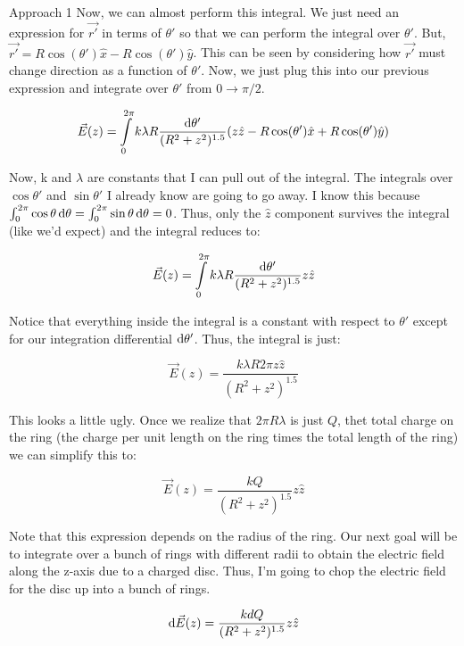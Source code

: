 \begin{homeworkProblem}
\begin{homeworkSection}{Approach 1}
        Now, we can almost perform this integral. We just need an
        expression for $\vec{r'}$ in terms of $\theta'$ so that we can
        perform the integral over $\theta'$. But, $\vec{r'} =
        R\cos(\theta')\hat{x} - R\cos(\theta')\hat{y}$. This can be seen
        by considering how $\vec{r'}$ must change direction as a
        function of $\theta'$. Now, we just plug this into our previous
        expression and integrate over $\theta'$ from $0 \rightarrow
        \pi/2$.

        \[ \vec{E}(z) = \int\limits_0^{2\pi} k \lambda R \frac{ \mathop{}\!\mathrm{d}
        \theta'}{(R^2+z^2)^{1.5}} (z \hat{z}-
        R\cos(\theta')\hat{x}+R\cos(\theta')\hat{y}) \]

        Now, k and $\lambda$ are constants that I can pull out of the
        integral. The integrals over $\cos\theta'$ and $\sin\theta'$ I
        already know are going to go away. I know this because
        $\int_0^{2\pi} \cos\theta \mathop{}\!\mathrm{d} \theta = \int_0^{2\pi}
        \sin\theta \mathop{}\!\mathrm{d} \theta = 0 $. Thus, only the $\hat{z}$
        component survives the integral (like we'd expect) and the
        integral reduces to:

        \[ \vec{E}(z) = \int\limits_0^{2\pi} k \lambda R \frac{ \mathop{}\!\mathrm{d}
        \theta'}{(R^2+z^2)^{1.5}} z \hat{z} \]

        Notice that everything inside the integral is a constant with
        respect to $\theta'$ except for our integration differential
        $\mathop{}\!\mathrm{d} \theta'$. Thus, the integral is just:

        \[ \vec{E}(z) = \frac{k\lambda R 2\pi z
        \hat{z}}{(R^2+z^2)^{1.5}} \]

        This looks a little ugly. Once we realize that $2\pi R \lambda$
        is just $Q$, thet total charge on the ring (the charge per unit
        length on the ring times the total length of the ring) we can
        simplify this to:

        \[ \vec{E}(z) = \frac{k Q }{(R^2+z^2)^{1.5}} z\hat{z} \]

        Note that this expression depends on the radius of the ring. Our
        next goal will be to integrate over a bunch of rings with
        different radii to obtain the electric field along the z-axis
        due to a charged disc. Thus, I'm going to chop the electric
        field for the disc up into a bunch of rings.
    
        \[ \mathop{}\!\mathrm{d} \vec{E}(z) = \frac{k dQ}{(R^2+z^2)^{1.5}} z\hat{z} \]


\end{homeworkSection}
\end{homeworkProblem}
